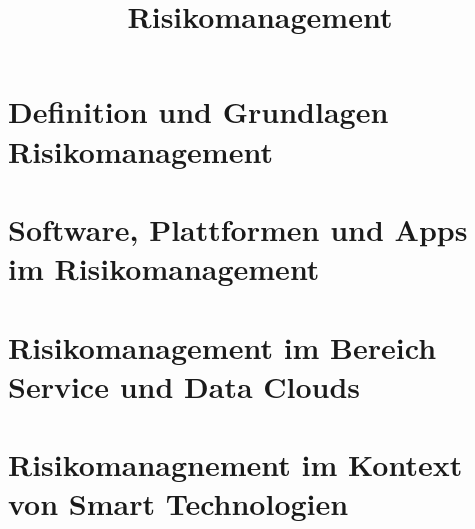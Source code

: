 \documentclass{report}
\begin{document}
\pagestyle{plain}

\title{Risikomanagement}


\maketitle

\tableofcontents
\newpage


\chapter{Definition und Grundlagen Risikomanagement}
\label{sect:grundlagen}


\chapter{Software, Plattformen und Apps im Risikomanagement}
\label{sect:software}



\chapter{Risikomanagement im Bereich Service und Data Clouds}
\label{sect:clouds}



\chapter{Risikomanagnement im Kontext von Smart Technologien}
\label{sect:relevance}




\end{document}
